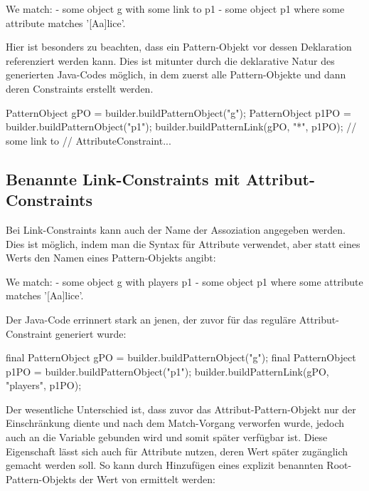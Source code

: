 \begin{mdcodeblock}
    We match:
    - some object g with some link to p1
    - some object p1 where some attribute matches '[Aa]lice'.
\end{mdcodeblock}

Hier ist besonders zu beachten, dass ein Pattern-Objekt vor dessen Deklaration referenziert werden kann.
Dies ist mitunter durch die deklarative Natur des generierten Java-Codes möglich, in dem zuerst alle Pattern-Objekte und dann deren Constraints erstellt werden.

\begin{jcodeblock}
    PatternObject gPO = builder.buildPatternObject("g");
    PatternObject p1PO = builder.buildPatternObject("p1");
    builder.buildPatternLink(gPO, "*", p1PO); // some link to
    // AttributeConstraint...
\end{jcodeblock}

\subsection{Benannte Link-Constraints mit Attribut-Constraints}

Bei Link-Constraints kann auch der Name der Assoziation angegeben werden.
Dies ist möglich, indem man die Syntax für Attribute verwendet, aber statt eines Werts den Namen eines Pattern-Objekts angibt:

\begin{mdcodeblock}
    We match:
    - some object g with players p1
    - some object p1 where some attribute matches '[Aa]lice'.
\end{mdcodeblock}

Der Java-Code errinnert stark an jenen, der zuvor für das reguläre Attribut-Constraint generiert wurde:

\begin{jcodeblock}
    final PatternObject gPO = builder.buildPatternObject("g");
    final PatternObject p1PO = builder.buildPatternObject("p1");
    builder.buildPatternLink(gPO, "players", p1PO);
\end{jcodeblock}

Der wesentliche Unterschied ist, dass zuvor das Attribut-Pattern-Objekt  nur der Einschränkung diente und nach dem Match-Vorgang verworfen wurde,  jedoch auch an die Variable  gebunden wird und somit später verfügbar ist.
Diese Eigenschaft lässt sich auch für Attribute nutzen, deren Wert später zugänglich gemacht werden soll.
So kann durch Hinzufügen eines explizit benannten Root-Pattern-Objekts der Wert von  ermittelt werden:

